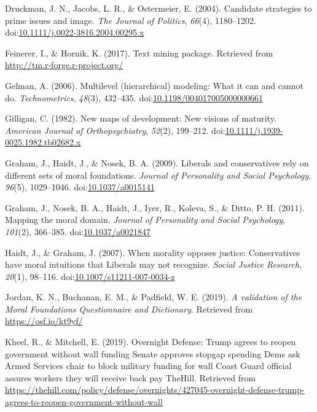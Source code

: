 \documentclass[english,,man]{apa6}
\begin{document}
\leavevmode\hypertarget{ref-Druckman2004}{}%
Druckman, J. N., Jacobs, L. R., \& Ostermeier, E. (2004). Candidate strategies to prime issues and image. \emph{The Journal of Politics}, \emph{66}(4), 1180--1202. doi:\href{https://doi.org/10.1111/j.0022-3816.2004.00295.x}{10.1111/j.0022-3816.2004.00295.x}

\leavevmode\hypertarget{ref-Feinerer2017}{}%
Feinerer, I., \& Hornik, K. (2017). Text mining package. Retrieved from \url{http://tm.r-forge.r-project.org/}

\leavevmode\hypertarget{ref-Gelman2006}{}%
Gelman, A. (2006). Multilevel (hierarchical) modeling: What it can and cannot do. \emph{Technometrics}, \emph{48}(3), 432--435. doi:\href{https://doi.org/10.1198/004017005000000661}{10.1198/004017005000000661}

\leavevmode\hypertarget{ref-Gilligan1982}{}%
Gilligan, C. (1982). New maps of development: New visions of maturity. \emph{American Journal of Orthopsychiatry}, \emph{52}(2), 199--212. doi:\href{https://doi.org/10.1111/j.1939-0025.1982.tb02682.x}{10.1111/j.1939-0025.1982.tb02682.x}

\leavevmode\hypertarget{ref-Graham2009}{}%
Graham, J., Haidt, J., \& Nosek, B. A. (2009). Liberals and conservatives rely on different sets of moral foundations. \emph{Journal of Personality and Social Psychology}, \emph{96}(5), 1029--1046. doi:\href{https://doi.org/10.1037/a0015141}{10.1037/a0015141}

\leavevmode\hypertarget{ref-Graham2011}{}%
Graham, J., Nosek, B. A., Haidt, J., Iyer, R., Koleva, S., \& Ditto, P. H. (2011). Mapping the moral domain. \emph{Journal of Personality and Social Psychology}, \emph{101}(2), 366--385. doi:\href{https://doi.org/10.1037/a0021847}{10.1037/a0021847}

\leavevmode\hypertarget{ref-Haidt2007}{}%
Haidt, J., \& Graham, J. (2007). When morality opposes justice: Conservatives have moral intuitions that Liberals may not recognize. \emph{Social Justice Research}, \emph{20}(1), 98--116. doi:\href{https://doi.org/10.1007/s11211-007-0034-z}{10.1007/s11211-007-0034-z}

\leavevmode\hypertarget{ref-Jordan2019}{}%
Jordan, K. N., Buchanan, E. M., \& Padfield, W. E. (2019). \emph{A validation of the Moral Foundations Questionnaire and Dictionary}. Retrieved from \url{https://osf.io/kt9yf/}

\leavevmode\hypertarget{ref-Kheel2019}{}%
Kheel, R., \& Mitchell, E. (2019). Overnight Defense: Trump agrees to reopen government without wall funding \textbar{} Senate approves stopgap spending \textbar{} Dems ask Armed Services chair to block military funding for wall \textbar{} Coast Guard official assures workers they will receive back pay \textbar{} TheHill. Retrieved from \url{https://thehill.com/policy/defense/overnights/427045-overnight-defense-trump-agrees-to-reopen-government-without-wall}
\end{document}
